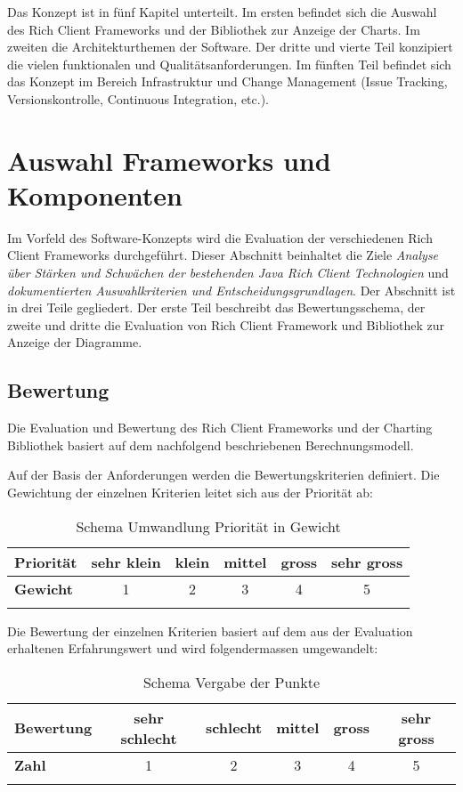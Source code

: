 Das Konzept ist in fünf Kapitel unterteilt. Im ersten befindet sich die Auswahl des Rich Client Frameworks und der Bibliothek zur Anzeige der Charts. Im zweiten die Architekturthemen der Software. Der dritte und vierte Teil konzipiert die vielen funktionalen und Qualitätsanforderungen. Im fünften Teil befindet sich das Konzept im Bereich Infrastruktur und Change Management (Issue Tracking, Versionskontrolle, Continuous Integration, etc.).


\chapter{Auswahl Frameworks und Komponenten}\label{selection_rcp_fw}
Im Vorfeld des Software-Konzepts wird die Evaluation der verschiedenen Rich Client Frameworks durchgeführt. Dieser Abschnitt beinhaltet  die Ziele \textit{Analyse über Stärken und Schwächen der bestehenden Java Rich Client Technologien} und \textit{dokumentierten Auswahlkriterien und Entscheidungsgrundlagen}. Der Abschnitt ist in drei Teile gegliedert. Der erste Teil beschreibt das Bewertungsschema, der zweite und dritte die Evaluation von Rich Client Framework und Bibliothek zur Anzeige der Diagramme.


\section{Bewertung}\label{bewertung}
Die Evaluation und Bewertung des Rich Client Frameworks und der Charting Bibliothek basiert auf dem nachfolgend beschriebenen Berechnungsmodell. 

Auf der Basis der Anforderungen werden die Bewertungskriterien definiert. Die Gewichtung  der einzelnen Kriterien leitet sich aus der Priorität ab:
\begin{longtable}{|l|c|c|c|c|c|}\hline
 \textbf{Priorität} & sehr klein & klein & mittel & gross & sehr gross\\\hline
 \textbf{Gewicht} & 1 & 2 & 3 & 4 & 5\\\hline
 \caption{Schema Umwandlung Priorität in Gewicht}
\end{longtable}

Die Bewertung der einzelnen Kriterien basiert auf dem aus der Evaluation erhaltenen Erfahrungswert und wird folgendermassen umgewandelt:
\begin{longtable}{|l|c|c|c|c|c|}\hline
 \textbf{Bewertung} & sehr schlecht & schlecht & mittel & gross & sehr gross\\\hline
 \textbf{Zahl} & 1 & 2 & 3 & 4 & 5\\\hline
 \caption{Schema Vergabe der Punkte}
\end{longtable}

